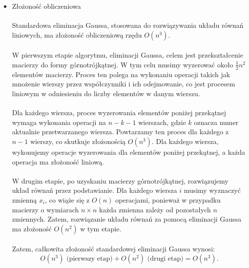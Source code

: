 \documentclass{article}
\begin{document}
\begin{itemize}

    \item Złożoność obliczeniowa \\ \\
Standardowa eliminacja Gaussa, stosowana do rozwiązywania układu równań liniowych, ma złożoność obliczeniową rzędu \( O(n^3) \). \\ \\
W pierwszym etapie algorytmu, eliminacji Gaussa, celem jest przekształcenie macierzy do formy górnotrójkątnej. W tym celu musimy wyzerować około \( \frac{1}{2}n^2 \) elementów macierzy. Proces ten polega na wykonaniu operacji takich jak mnożenie wierszy przez współczynniki i ich odejmowanie, co jest procesem liniowym w odniesieniu do liczby elementów w danym wierszu. 
\\ \\
Dla każdego wiersza, proces wyzerowania elementów poniżej przekątnej wymaga wykonania operacji na \( n-k-1 \) wierszach, gdzie \( k \) oznacza numer aktualnie przetwarzanego wiersza. Powtarzamy ten proces dla każdego z \( n-1 \) wierszy, co skutkuje złożonością \( O(n^3) \). Dla każdego wiersza, wykonujemy operacje wyzerowania dla elementów poniżej przekątnej, a każda operacja ma złożoność liniową.
\\ \\
W drugim etapie, po uzyskaniu macierzy górnotrójkątnej, rozwiązujemy układ równań przez podstawianie. Dla każdego wiersza \( i \) musimy wyznaczyć zmienną \( x_i \), co wiąże się z \( O(n) \) operacjami, ponieważ w przypadku macierzy o wymiarach \( n \times n \) każda zmienna zależy od pozostałych \( n \) zmiennych. Zatem, rozwiązanie układu równań za pomocą eliminacji Gaussa ma złożoność \( O(n^2) \) w tym etapie.
\\ \\
Zatem, całkowita złożoność standardowej eliminacji Gaussa wynosi:
\[
O(n^3) \text{ (pierwszy etap)} + O(n^2) \text{ (drugi etap)} = O(n^3).
\]

\\ \\


\end{itemize}
\end{document}
